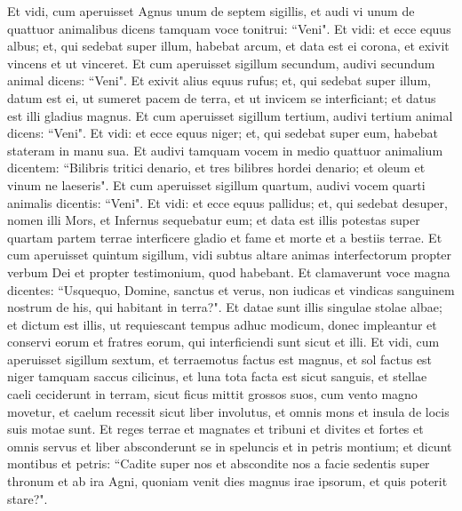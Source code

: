 \begin{biblechapter}  
\verse Et vidi, cum aperuisset Agnus unum de septem sigillis, et audi vi unum de quattuor animalibus dicens tamquam voce tonitrui: “Veni". 
\verse Et vidi: et ecce equus albus; et, qui sedebat super illum, habebat arcum, et data est ei corona, et exivit vincens et ut vinceret. 
\verse Et cum aperuisset sigillum secundum, audivi secundum animal dicens: “Veni".  
\verse Et exivit alius equus rufus; et, qui sedebat super illum, datum est ei, ut sumeret pacem de terra, et ut invicem se interficiant; et datus est illi gladius magnus. 
\verse Et cum aperuisset sigillum tertium, audivi tertium animal dicens: “Veni". Et vidi: et ecce equus niger; et, qui sedebat super eum, habebat stateram in manu sua. 
\verse Et audivi tamquam vocem in medio quattuor animalium dicentem: “Bilibris tritici denario, et tres bilibres hordei denario; et oleum et vinum ne laeseris". 
\verse Et cum aperuisset sigillum quartum, audivi vocem quarti animalis dicentis: “Veni". 
\verse Et vidi: et ecce equus pallidus; et, qui sedebat desuper, nomen illi Mors, et Infernus sequebatur eum; et data est illis potestas super quartam partem terrae interficere gladio et fame et morte et a bestiis terrae. 
\verse Et cum aperuisset quintum sigillum, vidi subtus altare animas interfectorum propter verbum Dei et propter testimonium, quod habebant. 
\verse Et clamaverunt voce magna dicentes: “Usquequo, Domine, sanctus et verus, non iudicas et vindicas sanguinem nostrum de his, qui habitant in terra?". 
\verse Et datae sunt illis singulae stolae albae; et dictum est illis, ut requiescant tempus adhuc modicum, donec impleantur et conservi eorum et fratres eorum, qui interficiendi sunt sicut et illi. 
\verse Et vidi, cum aperuisset sigillum sextum, et terraemotus factus est magnus, et sol factus est niger tamquam saccus cilicinus, et luna tota facta est sicut sanguis, 
\verse et stellae caeli ceciderunt in terram, sicut ficus mittit grossos suos, cum vento magno movetur, 
\verse et caelum recessit sicut liber involutus, et omnis mons et insula de locis suis motae sunt. 
\verse Et reges terrae et magnates et tribuni et divites et fortes et omnis servus et liber absconderunt se in speluncis et in petris montium; 
\verse et dicunt montibus et petris: “Cadite super nos et abscondite nos a facie sedentis super thronum et ab ira Agni, 
\verse quoniam venit dies magnus irae ipsorum, et quis poterit stare?". 
\end{biblechapter}

